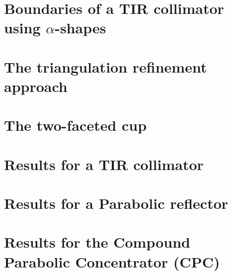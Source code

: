 \section{Boundaries of a TIR collimator using $\alpha$-shapes}
\label{sec:Tir_alpha}
\section{The triangulation refinement approach}

\section{The two-faceted cup}
\section{Results for a TIR collimator}
\section{Results for a Parabolic reflector}
\section{Results for the Compound Parabolic Concentrator (CPC)}

